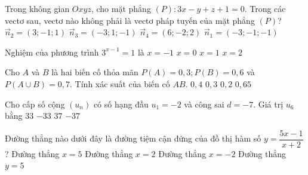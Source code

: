 \begin{ex}%
	Trong không gian $Oxyz$, cho mặt phẳng $(P)\colon 3x-y+z+1=0$. Trong các vectơ sau, vectơ nào không phải là vectơ pháp tuyến của mặt phẳng $(P)$?
	\choice
	{$\overrightarrow{n}_2=\left(3;-1;1\right)$}
	{$\overrightarrow{n}_3=\left(-3;1;-1\right)$}
	{$\overrightarrow{n}_4=\left(6;-2;2\right)$}
	{\True $\overrightarrow{n}_1=\left(-3;-1;-1\right)$}
\end{ex}

\begin{ex}%
	Nghiệm của phương trình $3^{x-1}=1$ là
	\choice
	{$x=-1$}
	{$x=0$}
	{\True $x=1$}
	{$x=2$}
\end{ex}

\begin{ex} %
	Cho $A$ và $B$ là hai biến cố thỏa mãn $P(A)=0{,}3;P(B)=0{,}6$ và $P(A\cup B)=0{,}7$. Tính xác suất của biến cố $AB$.
	\choice
	{$0{,}4$}
	{$0{,}3$}
	{\True $0{,}2$}
	{$0{,}65$}
\end{ex}

\begin{ex} %
	Cho cấp số cộng $(u_n)$ có số hạng đầu $u_1=-2$ và công sai $d=-7$. Giá trị $u_6$ bằng
	\choice
	{$33$}
	{$-33$}
	{$37$}
	{\True $-37$}
\end{ex}

\begin{ex} %
	Đường thẳng nào dưới đây là đường tiệm cận đứng của đồ thị hàm số $y=\dfrac{5x-1}{x+2}$?
	\choice
	{Đường thẳng $x=5$}
	{Đường thẳng $x=2$}
	{\True Đường thẳng $x=-2$}
	{Đường thẳng $y=5$}
\end{ex}

